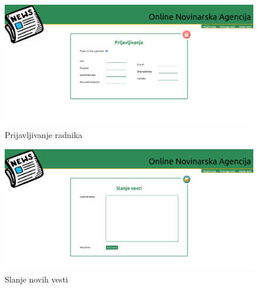 \documentclass{article}
\begin{document}
\begin{figure}[htbp!]
    \centering
    \includegraphics[scale=0.23]{PrijavljivanjeRadnika.png}
    \caption{Prijavljivanje radnika}
    \label{slk:dtp}
\end{figure}

\begin{figure}[htbp!]
    \centering
    \includegraphics[scale=0.23]{SlanjeVesti.png}
    \caption{Slanje novih vesti}
    \label{slk:dtp}
\end{figure}
\end{document}
